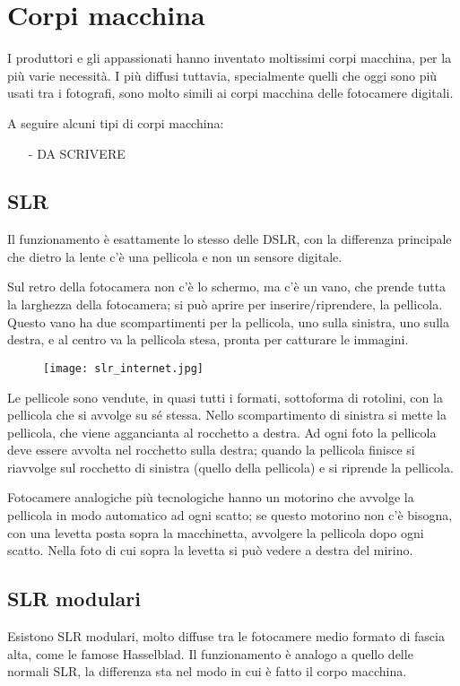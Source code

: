 \section{Corpi macchina} \label{sec:analog_corpimacchina}
I produttori e gli appassionati hanno inventato moltissimi corpi macchina, per la più varie necessità.
I più diffusi tuttavia, specialmente quelli che oggi sono più usati tra i fotografi, sono molto simili ai corpi macchina delle fotocamere digitali.

A seguire alcuni tipi di corpi macchina:
\begin{itemize}
    \item[-] DA SCRIVERE
\end{itemize}

\subsection{SLR} \label{subsec:slr}
Il funzionamento è esattamente lo stesso delle DSLR, con la differenza principale che dietro la lente c'è una pellicola e non un sensore digitale.

Sul retro della fotocamera non c'è lo schermo, ma c'è un vano, che prende tutta la larghezza della fotocamera; si può aprire per inserire/riprendere, la pellicola.
Questo vano ha due scompartimenti per la pellicola, uno sulla sinistra, uno sulla destra, e al centro va la pellicola stesa, pronta per catturare le immagini.

\begin{figure*}[h]
    \centering
    \texttt{[image: slr\_internet.jpg]}
\end{figure*}

Le pellicole sono vendute, in quasi tutti i formati, sottoforma di rotolini, con la pellicola che si avvolge su sé stessa.
Nello scompartimento di sinistra si mette la pellicola, che viene aggancianta al rocchetto a destra.
Ad ogni foto la pellicola deve essere avvolta nel rocchetto sulla destra; quando la pellicola finisce si riavvolge sul rocchetto di sinistra (quello della pellicola) e si riprende la pellicola.

Fotocamere analogiche più tecnologiche hanno un motorino che avvolge la pellicola in modo automatico ad ogni scatto; se questo motorino non c'è bisogna, con una levetta posta sopra la macchinetta, avvolgere la pellicola dopo ogni scatto.
Nella foto di cui sopra la levetta si può vedere a destra del mirino.


\subsection{SLR modulari} \label{subsec:slrmodulari}
Esistono SLR modulari, molto diffuse tra le fotocamere medio formato di fascia alta, come le famose Hasselblad.
Il funzionamento è analogo a quello delle normali SLR, la differenza sta nel modo in cui è fatto il corpo macchina.

